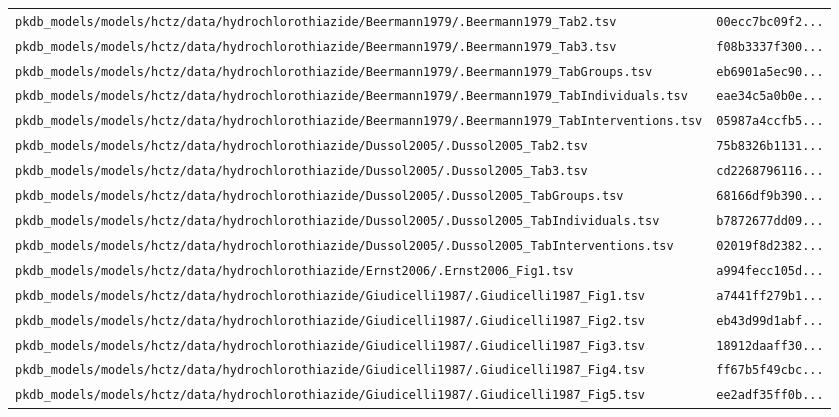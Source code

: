 \begin{longtable}{ll}
\texttt{pkdb\_models/models/hctz/data/hydrochlorothiazide/Beermann1979/.Beermann1979\_Tab2.tsv} & \texttt{00ecc7bc09f2...} \\
\texttt{pkdb\_models/models/hctz/data/hydrochlorothiazide/Beermann1979/.Beermann1979\_Tab3.tsv} & \texttt{f08b3337f300...} \\
\texttt{pkdb\_models/models/hctz/data/hydrochlorothiazide/Beermann1979/.Beermann1979\_TabGroups.tsv} & \texttt{eb6901a5ec90...} \\
\texttt{pkdb\_models/models/hctz/data/hydrochlorothiazide/Beermann1979/.Beermann1979\_TabIndividuals.tsv} & \texttt{eae34c5a0b0e...} \\
\texttt{pkdb\_models/models/hctz/data/hydrochlorothiazide/Beermann1979/.Beermann1979\_TabInterventions.tsv} & \texttt{05987a4ccfb5...} \\
\texttt{pkdb\_models/models/hctz/data/hydrochlorothiazide/Dussol2005/.Dussol2005\_Tab2.tsv} & \texttt{75b8326b1131...} \\
\texttt{pkdb\_models/models/hctz/data/hydrochlorothiazide/Dussol2005/.Dussol2005\_Tab3.tsv} & \texttt{cd2268796116...} \\
\texttt{pkdb\_models/models/hctz/data/hydrochlorothiazide/Dussol2005/.Dussol2005\_TabGroups.tsv} & \texttt{68166df9b390...} \\
\texttt{pkdb\_models/models/hctz/data/hydrochlorothiazide/Dussol2005/.Dussol2005\_TabIndividuals.tsv} & \texttt{b7872677dd09...} \\
\texttt{pkdb\_models/models/hctz/data/hydrochlorothiazide/Dussol2005/.Dussol2005\_TabInterventions.tsv} & \texttt{02019f8d2382...} \\
\texttt{pkdb\_models/models/hctz/data/hydrochlorothiazide/Ernst2006/.Ernst2006\_Fig1.tsv} & \texttt{a994fecc105d...} \\
\texttt{pkdb\_models/models/hctz/data/hydrochlorothiazide/Giudicelli1987/.Giudicelli1987\_Fig1.tsv} & \texttt{a7441ff279b1...} \\
\texttt{pkdb\_models/models/hctz/data/hydrochlorothiazide/Giudicelli1987/.Giudicelli1987\_Fig2.tsv} & \texttt{eb43d99d1abf...} \\
\texttt{pkdb\_models/models/hctz/data/hydrochlorothiazide/Giudicelli1987/.Giudicelli1987\_Fig3.tsv} & \texttt{18912daaff30...} \\
\texttt{pkdb\_models/models/hctz/data/hydrochlorothiazide/Giudicelli1987/.Giudicelli1987\_Fig4.tsv} & \texttt{ff67b5f49cbc...} \\
\texttt{pkdb\_models/models/hctz/data/hydrochlorothiazide/Giudicelli1987/.Giudicelli1987\_Fig5.tsv} & \texttt{ee2adf35ff0b...} \\

\end{longtable}
